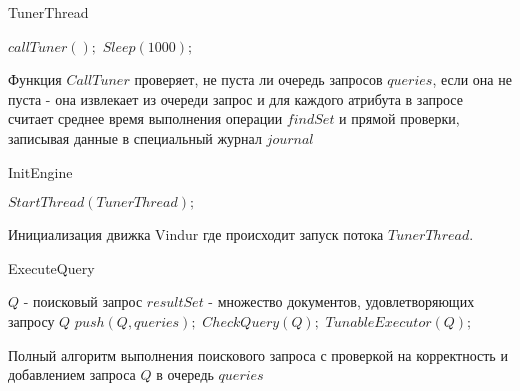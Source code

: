 \documentclass{matmex-diploma}
\begin{document}
        \begin{algorithm}[H]
        \caption{TunerThread}
        \label{tunerThread}
            \begin{algorithmic}
                    \STATE $callTuner();$
                    \STATE $Sleep(1000);$
                \ENDWHILE
            \end{algorithmic}
        \end{algorithm}
        
        Функция $CallTuner$ проверяет, не пуста ли очередь запросов $queries$, если она не пуста - она извлекает из очереди запрос и для каждого атрибута в запросе считает среднее время выполнения операции $findSet$ и прямой проверки, записывая данные в специальный журнал $journal$   
        
        \begin{algorithm}[H]
        \caption{InitEngine}
        \label{init}
            \begin{algorithmic}
                \STATE $StartThread(TunerThread);$
            \end{algorithmic}
        \end{algorithm}
        
        Инициализация движка Vindur где происходит запуск потока $TunerThread$.
        
        \begin{algorithm}[H]
        \caption{ExecuteQuery}
        \label{exec}
            \begin{algorithmic}
                \REQUIRE $Q$ - поисковый запрос
                \ENSURE $resultSet$ - множество документов, удовлетворяющих запросу $Q$
                \STATE $push(Q, queries);$
                \STATE $CheckQuery(Q);$  
                \RETURN $TunableExecutor(Q);$
            \end{algorithmic}
        \end{algorithm}
        
        Полный алгоритм выполнения поискового запроса с проверкой на корректность и добавлением запроса $Q$ в очередь $queries$ 
        
\end{document}
